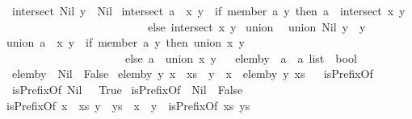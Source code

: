 \begin{isabellebody}
\isanewline
\ \ {\isachardoublequoteopen}intersect\ Nil\ y\ {\isacharequal}\ Nil{\isachardoublequoteclose}\isanewline
{\isacharbar}\ {\isachardoublequoteopen}intersect\ {\isacharparenleft}a\ {\isacharhash}\ x{\isacharparenright}\ y\ {\isacharequal}\ {\isacharparenleft}if\ member\ a\ y\ then\ a\ {\isacharhash}\ {\isacharparenleft}intersect\ x\ y{\isacharparenright}\isanewline
\ \ \ \ \ \ \ \ \ \ \ \ \ \ \ \ \ \ \ \ \ \ \ \ \ \ else\ intersect\ x\ y{\isacharparenright}{\isachardoublequoteclose}\isanewline
\isanewline
{}\isamarkupfalse%
\ union\isanewline
{}\isanewline
\ \ {\isachardoublequoteopen}union\ Nil\ y\ {\isacharequal}\ y{\isachardoublequoteclose}\isanewline
{\isacharbar}\ {\isachardoublequoteopen}union\ {\isacharparenleft}a\ {\isacharhash}\ x{\isacharparenright}\ y\ {\isacharequal}\ {\isacharparenleft}if\ {\isacharparenleft}member\ a\ y{\isacharparenright}\ then\ {\isacharparenleft}union\ x\ y{\isacharparenright}\isanewline
\ \ \ \ \ \ \ \ \ \ \ \ \ \ \ \ \ \ \ \ \ \ else\ a\ {\isacharhash}\ {\isacharparenleft}union\ x\ y{\isacharparenright}{\isacharparenright}{\isachardoublequoteclose}\isanewline
\isanewline
\ \isanewline
{}\isamarkupfalse%
\ elem{\isacharunderscore}by\ {\isacharcolon}{\isacharcolon}\ {\isachardoublequoteopen}{\isacharprime}a\ {\isasymRightarrow}\ {\isacharprime}a\ list\ {\isasymRightarrow}\ bool{\isachardoublequoteclose}\isanewline
{}\isanewline
\ \ {\isachardoublequoteopen}elem{\isacharunderscore}by\ {\isacharunderscore}\ Nil\ {\isacharequal}\ False{\isachardoublequoteclose}\isanewline
{\isacharbar}\ {\isachardoublequoteopen}elem{\isacharunderscore}by\ y\ {\isacharparenleft}x\ {\isacharhash}\ xs{\isacharparenright}\ {\isacharequal}\ {\isacharparenleft}y\ {\isacharequal}\ x\ {\isacharbar}\ elem{\isacharunderscore}by\ y\ xs{\isacharparenright}{\isachardoublequoteclose}\isanewline
\isanewline
\ \isanewline
{}\isamarkupfalse%
\ isPrefixOf\isanewline
{}\isanewline
\ \ {\isachardoublequoteopen}isPrefixOf\ Nil\ {\isacharunderscore}\ {\isacharequal}\ True{\isachardoublequoteclose}\isanewline
{\isacharbar}\ {\isachardoublequoteopen}isPrefixOf\ {\isacharunderscore}\ Nil\ {\isacharequal}\ False{\isachardoublequoteclose}\isanewline
{\isacharbar}\ {\isachardoublequoteopen}isPrefixOf\ {\isacharparenleft}x\ {\isacharhash}\ xs{\isacharparenright}\ {\isacharparenleft}y\ {\isacharhash}\ ys{\isacharparenright}\ {\isacharequal}\ {\isacharparenleft}x\ {\isacharequal}\ y\ {\isacharampersand}\ isPrefixOf\ xs\ ys{\isacharparenright}{\isachardoublequoteclose}\isanewline

\end{isabellebody}
